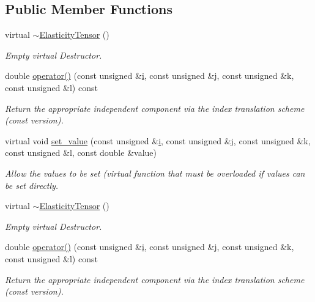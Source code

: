 \subsection*{Public Member Functions}
\begin{DoxyCompactItemize}
\item 
virtual \hyperlink{classoomph_1_1ElasticityTensor_a33d3d0462cfe9c230444ceb27db744d8}{$\sim$\+Elasticity\+Tensor} ()
\begin{DoxyCompactList}\small\item\em Empty virtual Destructor. \end{DoxyCompactList}\item 
double \hyperlink{classoomph_1_1ElasticityTensor_a60e0ebb9f03c21d11aa874dfdf5437ae}{operator()} (const unsigned \&\hyperlink{cfortran_8h_adb50e893b86b3e55e751a42eab3cba82}{i}, const unsigned \&j, const unsigned \&k, const unsigned \&l) const
\begin{DoxyCompactList}\small\item\em Return the appropriate independent component via the index translation scheme (const version). \end{DoxyCompactList}\item 
virtual void \hyperlink{classoomph_1_1ElasticityTensor_ab68e4386f02f9e39095d879e4ec96df5}{set\+\_\+value} (const unsigned \&\hyperlink{cfortran_8h_adb50e893b86b3e55e751a42eab3cba82}{i}, const unsigned \&j, const unsigned \&k, const unsigned \&l, const double \&value)
\begin{DoxyCompactList}\small\item\em Allow the values to be set (virtual function that must be overloaded if values can be set directly. \end{DoxyCompactList}\item 
virtual \hyperlink{classoomph_1_1ElasticityTensor_a33d3d0462cfe9c230444ceb27db744d8}{$\sim$\+Elasticity\+Tensor} ()
\begin{DoxyCompactList}\small\item\em Empty virtual Destructor. \end{DoxyCompactList}\item 
double \hyperlink{classoomph_1_1ElasticityTensor_a60e0ebb9f03c21d11aa874dfdf5437ae}{operator()} (const unsigned \&\hyperlink{cfortran_8h_adb50e893b86b3e55e751a42eab3cba82}{i}, const unsigned \&j, const unsigned \&k, const unsigned \&l) const
\begin{DoxyCompactList}\small\item\em Return the appropriate independent component via the index translation scheme (const version). \end{DoxyCompactList}\end{DoxyCompactItemize}
